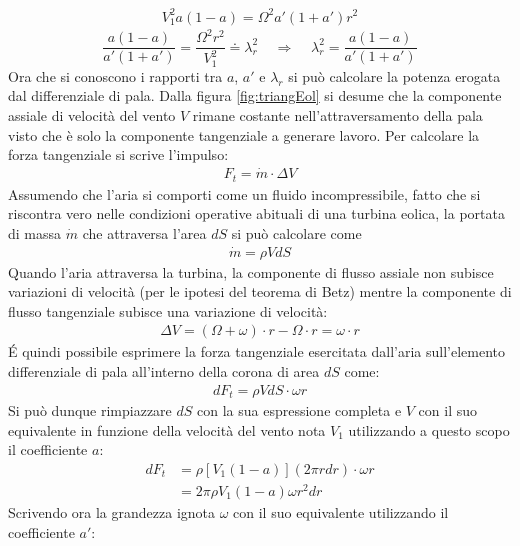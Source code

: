 \begin{align*}
V_1^2 a \left( 1 - a \right) = \Omega^2 a' \left( 1 + a' \right) r^2
\end{align*}
\begin{equation}\label{eq:lambdara}
\frac{a \left( 1 - a \right)}{a' \left(1 + a' \right)} = \frac{\Omega^2 r^2}{V_1^2}\doteq \lambda_r^2 \;\;\;\; \Rightarrow \;\;\;\; \boxed{\lambda_r^2 = \frac{a \left(1 - a \right)}{a' \left( 1 + a' \right)}}
\end{equation}
Ora che si conoscono i rapporti tra $a$, $a'$ e $\lambda_r$ si può calcolare la potenza erogata dal differenziale di pala. Dalla figura \ref{fig:triangEol} si desume che la componente assiale di velocità del vento $V$ rimane costante nell'attraversamento della pala visto che è solo la componente tangenziale a generare lavoro. Per calcolare la forza tangenziale si scrive l'impulso:
\begin{align*}
F_t = \dot{m} \cdot \Delta V
\end{align*}
Assumendo che l'aria si comporti come un fluido incompressibile, fatto che si riscontra vero nelle condizioni operative abituali di una turbina eolica, la portata di massa $\dot{m}$ che attraversa l'area $dS$ si può calcolare come 
\begin{align*}
\dot{m} = \rho V dS
\end{align*}
Quando l'aria attraversa la turbina, la componente di flusso assiale non subisce variazioni di velocità (per le ipotesi del teorema di Betz) mentre la componente di flusso tangenziale subisce una variazione di velocità:
\begin{align*}
\Delta V = \left( \Omega + \omega \right) \cdot r - \Omega \cdot r = \omega \cdot r
\end{align*}
\'E quindi possibile esprimere la forza tangenziale esercitata dall'aria sull'elemento differenziale di pala all'interno della corona di area $dS$ come:
\begin{align*}
dF_t = \rho V dS \cdot \omega r
\end{align*}
Si può dunque rimpiazzare $dS$ con la sua espressione completa e $V$ con il suo equivalente in funzione della velocità del vento nota $V_1$ utilizzando a questo scopo il coefficiente $a$:
\begin{align*}
dF_t &= \rho \left[ V_1 \left(1 -a \right) \right] \left( 2 \pi r dr \right) \cdot \omega r\\
& = 2 \pi \rho V_1 \left( 1-a \right) \omega r^2 dr
\end{align*}
Scrivendo ora la grandezza ignota $\omega$ con il suo equivalente utilizzando il coefficiente $a'$:
